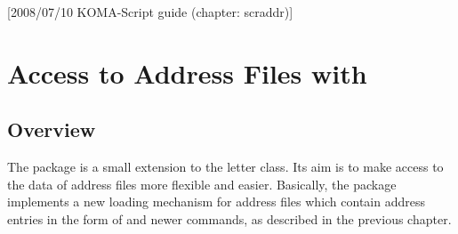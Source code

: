 %
%
%
%
%
%
%
%
% 
%
%
%
%

[2008/07/10 KOMA-Script guide (chapter: scraddr)]


\chapter{Access to Address Files with }%
%

\section{Overview}\label{sec:scraddr.overview}
The package  is a small extension to the
{\KOMAScript} letter class.  Its aim is to make access to the data of
address files more flexible and easier.  Basically, the package
implements a new loading mechanism for address files which contain
address entries in the form of  and newer
 commands, as described in the previous chapter.

